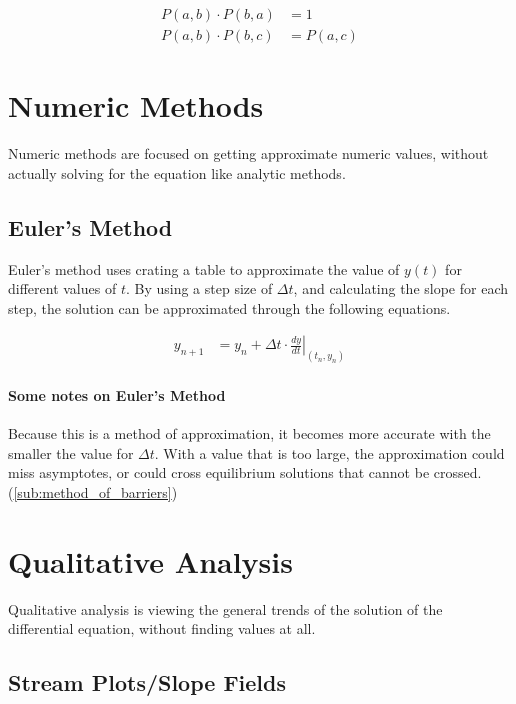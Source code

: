 \documentclass{article}
\begin{document}
\begin{align}
  P(a, b) \cdot P(b,a) &= 1\\
  P(a, b) \cdot P(b, c) &= P(a,c)
\end{align}

\section{Numeric Methods}\label{sec:numeric_methods}

Numeric methods are focused on getting approximate numeric values, without
actually solving for the equation like analytic methods.

\subsection{Euler's Method}\label{sub:euler_s_method}

Euler's method uses crating a table to approximate the value of $y(t)$ for
different values of $t$. By using a step size of $\Delta t$, and calculating
the slope for each step, the solution can be approximated through the following
equations.

\begin{align}
y_{n+1} &= y_n + \Delta t \cdot \left.\frac{dy}{dt}\right\vert_{(t_n, y_n)}
\end{align}

\paragraph{Some notes on Euler's Method}\label{par:some_notes_on_euler_s_method}

Because this is a method of approximation, it becomes more accurate with the
smaller the value for $\Delta t$. With a value that is too large, the
approximation could miss asymptotes, or could cross equilibrium solutions that
cannot be crossed. (\ref{sub:method_of_barriers})

\section{Qualitative Analysis}\label{sec:qualitative_analysis}

Qualitative analysis is viewing the general trends of the solution of the
differential equation, without finding values at all.

\subsection{Stream Plots/Slope Fields}\label{sub:stream_plots_slope_fields}
\end{document}
